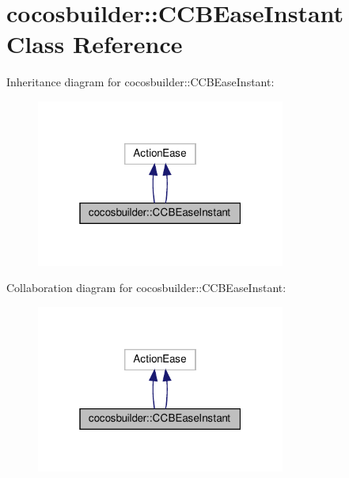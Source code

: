 \hypertarget{classcocosbuilder_1_1CCBEaseInstant}{}\section{cocosbuilder\+:\+:C\+C\+B\+Ease\+Instant Class Reference}
\label{classcocosbuilder_1_1CCBEaseInstant}


Inheritance diagram for cocosbuilder\+:\+:C\+C\+B\+Ease\+Instant\+:
\nopagebreak
\begin{figure}[H]
\begin{center}
\leavevmode
\includegraphics[width=232pt]{classcocosbuilder_1_1CCBEaseInstant__inherit__graph}
\end{center}
\end{figure}


Collaboration diagram for cocosbuilder\+:\+:C\+C\+B\+Ease\+Instant\+:
\nopagebreak
\begin{figure}[H]
\begin{center}
\leavevmode
\includegraphics[width=232pt]{classcocosbuilder_1_1CCBEaseInstant__coll__graph}
\end{center}
\end{figure}
